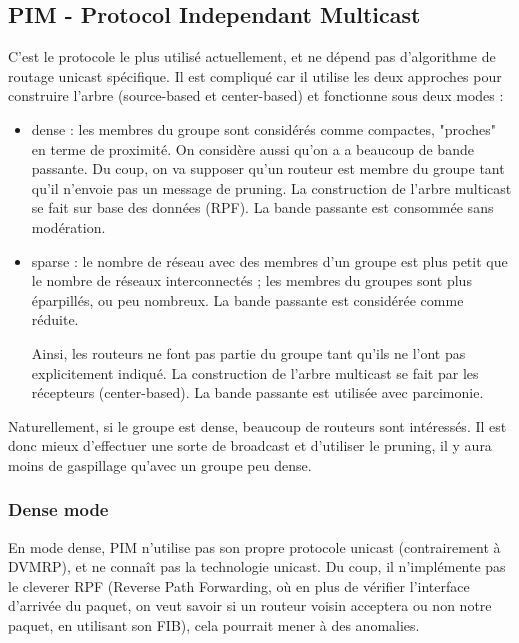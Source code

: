 \documentclass[10pt,a4paper]{report}
\begin{document}
		\subsection{PIM - Protocol Independant Multicast}
		
		C'est le protocole le plus utilisé actuellement, et ne dépend pas d'algorithme de routage unicast spécifique. Il est compliqué car il utilise les deux approches pour construire l'arbre (source-based et center-based) et fonctionne sous deux modes :
		
		\begin{itemize}
			\item dense : les membres du groupe sont considérés comme compactes, "proches" en terme de proximité. On considère aussi qu'on a a beaucoup de bande passante.
			Du coup, on va supposer qu'un routeur est membre du groupe tant qu'il n'envoie pas un message de pruning. La construction de l'arbre multicast se fait sur base des données (RPF). La bande passante est consommée sans modération.
			
			
			\item sparse : le nombre de réseau avec des membres d'un groupe est plus petit que le nombre de réseaux interconnectés ; les membres du groupes sont plus éparpillés, ou peu nombreux. La bande passante est considérée comme réduite.
			
			Ainsi, les routeurs ne font pas partie du groupe tant qu'ils ne l'ont pas explicitement indiqué. La construction de l'arbre multicast se fait par les récepteurs (center-based). La bande passante est utilisée avec parcimonie.
		\end{itemize}
		
		Naturellement, si le groupe est dense, beaucoup de routeurs sont intéressés. Il est donc mieux d'effectuer une sorte de broadcast et d'utiliser le pruning, il y aura moins de gaspillage qu'avec un groupe peu dense.
		
		\subsubsection{Dense mode}
		
		En mode dense, PIM n'utilise pas son propre protocole unicast (contrairement à DVMRP), et ne connaît pas la technologie unicast. Du coup, il n'implémente pas le cleverer RPF (Reverse Path Forwarding, où en plus de vérifier l'interface d'arrivée du paquet, on veut savoir si un routeur voisin acceptera ou non notre paquet, en utilisant son FIB), cela pourrait mener à des anomalies.
		
\end{document}
